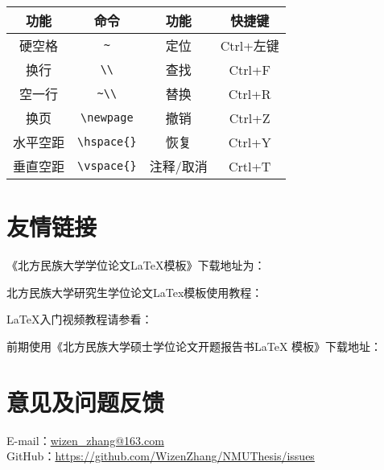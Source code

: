 \begin{center}
	\begin{tabular}{cc|cc}
		\toprule
		功能  & 命令 & 功能 & 快捷键   \\
		\midrule
		硬空格 & \verb|~| & 定位 & Ctrl+左键 \\
		换行 & \verb|\\| & 查找 & Ctrl+F \\
		空一行 & \verb|~\\| & 替换 & Ctrl+R \\
		换页 & \verb|\newpage| & 撤销 & Ctrl+Z \\
		水平空距 & \verb|\hspace{}| & 恢复 & Ctrl+Y \\
		垂直空距 & \verb|\vspace{}| & 注释/取消 & Crtl+T \\
		\bottomrule
	\end{tabular}
\end{center}

\section{友情链接}
\label{friendly_link}
\noindent《北方民族大学学位论文\LaTeX{}模板》下载地址为：


\noindent 北方民族大学研究生学位论文LaTex模板使用教程：



\noindent \LaTeX{}入门视频教程请参看：


\noindent 前期使用《北方民族大学硕士学位论文开题报告书\LaTeX{} 模板》下载地址：


\section{意见及问题反馈}

\indent E-mail：\href{mailto:wizen_zhang@163.com}{wizen\_zhang@163.com}\\
\indent GitHub：\href{https://github.com/WizenZhang/NMUThesis/issues}{https://github.com/WizenZhang/NMUThesis/issues}


